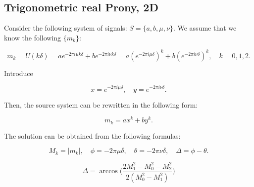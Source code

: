 \subsection{Trigonometric real Prony, 2D}

Consider the following system of signals: $S = \{ a, b, \mu, \nu \}$. We assume that we know the following $\{m_k\}$:

\begin{equation}
  \label{eq:TProny2D-mk}
  m_k = 
  U(k\delta) = 
  a e^{-2\pi i \mu k \delta} + b e^{-2\pi i \nu k \delta} =
  a (e^{-2\pi i \mu \delta})^k + b (e^{-2\pi i \nu \delta})^k, \quad
  k = 0, 1, 2.
\end{equation}

Introduce

$$
  x = e^{-2\pi i \mu \delta}, \quad 
  y = e^{-2\pi i \nu \delta}.
$$

Then, the source system can be rewritten in the following form:

$$
  m_k = ax^k + by^k.
$$

The solution can be obtained from the following formulas:

$$
  M_k = |m_k|, \quad
  \phi = -2\pi \mu \delta, \quad
  \theta = -2\pi \nu \delta, \quad
  \Delta = \phi - \theta.
$$

$$
  \Delta = \arccos \Bigg( 
    \dfrac{2 M_1^2 - M_0^2 - M_2^2}{2(M_0^2 - M_1^2)} 
  \Bigg)
$$
